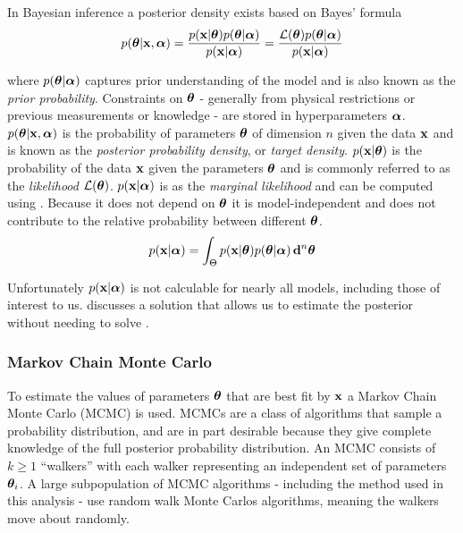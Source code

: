 In Bayesian inference a posterior density exists based on Bayes' formula
\begin{equation}
p(\boldsymbol{\theta}|\mathbf{x}, \boldsymbol{\alpha}) = \frac{p(\mathbf{x}|\boldsymbol{\theta})
p(\boldsymbol{\theta}|\boldsymbol{\alpha})}{p(\mathbf{x}|\boldsymbol{\alpha})} = \frac{\mathcal{L}(\boldsymbol{\theta})
p(\boldsymbol{\theta}|\boldsymbol{\alpha})}{p(\mathbf{x}|\boldsymbol{\alpha})}
\end{equation}

\noindent where $p(\boldsymbol{\theta}|\boldsymbol{\alpha})$ captures prior understanding of the
model and is also known as the
\textit{prior probability}.  Constraints on $\boldsymbol{\theta}$ - generally from physical restrictions or previous measurements or
knowledge - are stored in hyperparameters $\boldsymbol{\alpha}$.  $p(\boldsymbol{\theta}|\mathbf{x}, \boldsymbol{\alpha})$ is the probability of
parameters $\boldsymbol{\theta}$ of dimension $n$ given the
data $\mathbf{x}$ and is known as the \textit{posterior probability density}, or \textit{target
density}.  $p(\mathbf{x}|\boldsymbol{\theta})$ is the probability of the data $\mathbf{x}$ given the parameters
$\boldsymbol{\theta}$ and is
commonly referred to as the \textit{likelihood} $\mathcal{L}(\boldsymbol{\theta})$.  $p(\mathbf{x}|\boldsymbol{\alpha})$ is as the
\textit{marginal likelihood}
and can be computed using .  Because it does not depend on
$\boldsymbol{\theta}$ it is model-independent and does not contribute to the relative probability between different
$\boldsymbol{\theta}$.
\begin{equation}
p(\mathbf{x}|\boldsymbol{\alpha}) = \int_{\Theta} p(\mathbf{x}|\boldsymbol{\theta}) p(\boldsymbol{\theta}|\boldsymbol{\alpha})\, \mathbf{d}^n \boldsymbol{\theta}
\label{eq:er_nr_calibrations_parameter_determ_mc_match_p_data}
\end{equation}

Unfortunately $p(\mathbf{x}|\boldsymbol{\alpha})$ is not calculable for nearly all models, including those of interest to
us.   discusses a solution that allows us to estimate the posterior without
needing to solve .



\subsubsection{Markov Chain Monte Carlo}
\label{subsubsec:er_nr_calibrations_parameter_determ_mcmc}
To estimate the values of parameters $\boldsymbol{\theta}$ that are best fit by $\mathbf{x}$ a Markov Chain Monte Carlo (MCMC) is used.  MCMCs
are a class of algorithms that sample a probability distribution, and are in part desirable because they
give complete knowledge of the full posterior probability
distribution.  An MCMC consists of $k \geq 1$ ``walkers'' with each walker representing an independent set of parameters
$\boldsymbol{\theta}_i$.  A large
subpopulation of MCMC algorithms - including the method used in this analysis - use random walk Monte Carlos algorithms, meaning the
walkers move about randomly.


